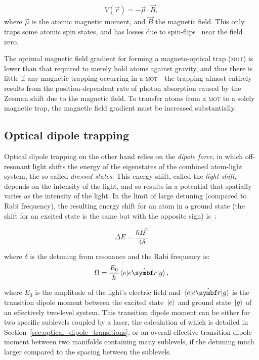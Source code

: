 \begin{equation}
V(\vec{r}) = -\vec \mu \cdot \vec B,
\end{equation}
where $\vec\mu$ is the atomic magnetic moment, and $\vec B$ the magnetic field. This only traps some atomic spin states, and has losses due to spin-flips~\cite{brink_majorana_2006} near the field zero.

The optimal magnetic field gradient for forming a magneto-optical trap (\textsc{mot}) is lower than that required to merely hold atoms against gravity, and thus there is little if any magnetic trapping occurring in a \textsc{mot}---the trapping almost entirely results from the position-dependent rate of photon absorption caused by the Zeeman shift due to the magnetic field. To transfer atoms from a \textsc{mot} to a solely magnetic trap, the magnetic field gradient must be increased substantially.

\subsection{Optical dipole trapping}

Optical dipole trapping on the other hand relies on the \emph{dipole force}, in which off-resonant light shifts the energy of the eigenstates of the combined atom-light system, the so called \emph{dressed states}. This energy shift, called the \emph{light shift}, depends on the intensity of the light, and so results in a potential that spatially varies as the intensity of the light. In the limit of large detuning (compared to Rabi frequency), the resulting energy shift for an atom in a ground state (the shift for an excited state is the same but with the opposite sign) is~\cite[p 8]{metcalf_laser_1999}:

\begin{equation}
\Delta E = \frac{\hbar\Omega^2}{4\delta}
\end{equation}

where $\delta$ is the detuning from resonance and the Rabi frequency is:
\begin{equation}
\Omega=\frac{E_0}\hbar\matrixel{e}{e\hat{\vec r}}{g},
\end{equation}

where $E_0$ is the amplitude of the light's electric field and  $\matrixel{e}{e\hat{\vec r}}{g}$ is the transition dipole moment between the excited state $\ket{e}$ and ground state $\ket{g}$ of an effectively two-level system. This transition dipole moment can be either for two specific sublevels coupled by a laser, the calculation of which is detailed in Section~\ref{sec:optical_dipole_transitions}, or an overall effective transition dipole moment between two manifolds containing many sublevels, if the detuning much larger compared to the spacing between the sublevels.

